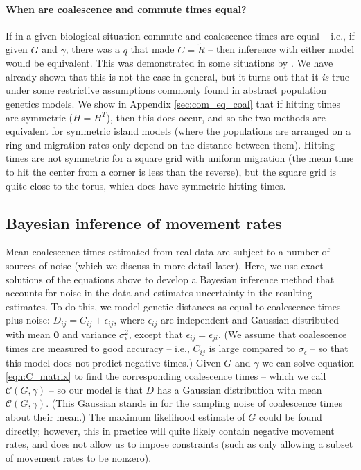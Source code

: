 \documentclass{article}
\newcommand{\comdist}{\widetilde{R}}
\begin{document}
\paragraph{When are coalescence and commute times equal?}
If in a given biological situation commute and coalescence times are equal --
i.e., if given $G$ and $\gamma$, there was a $q$ that made $C = \comdist$ --
then inference with either model would be equivalent.
This was demonstrated in some situations by \citet{mcrae2006isolation}.
We have already shown that this is not the case in general,
but it turns out that it \emph{is} true
under some restrictive assumptions commonly found in abstract population genetics models. 
We show in Appendix \ref{sec:com_eq_coal} that
if hitting times are symmetric ($H = H^T$),
then this does occur,
and so the two methods are equivalent for symmetric island models
(where the populations are arranged on a ring 
and migration rates only depend on the distance between them).
Hitting times are not symmetric for a square grid with uniform migration
(the mean time to hit the center from a corner is less than the reverse),
but the square grid is quite close to the torus, which does have symmetric hitting times.


\subsection*{Bayesian inference of movement rates}

Mean coalescence times estimated from real data are subject to a number of sources of noise
(which we discuss in more detail later).
Here, we use
exact solutions of the equations above
to develop a Bayesian inference method that accounts for noise in the data
and estimates uncertainty in the resulting estimates.
To do this, we model genetic distances as equal to coalescence times plus noise:
$D_{ij} = C_{ij} + \epsilon_{ij}$,
where $\epsilon_{ij}$ are independent and Gaussian distributed
with mean $\mathbf{0}$ and variance $\sigma_\epsilon^2$,
except that $\epsilon_{ij} = \epsilon_{ji}$.
(We assume that coalescence times are measured to good accuracy 
-- i.e., $C_{ij}$ is large compared to $\sigma_{\epsilon}$ -- 
so that this model does not predict negative times.)
Given $G$ and $\gamma$ we can solve equation \eqref{eqn:C_matrix} 
to find the corresponding coalescence times
-- which we call $\mathcal{C}(G, \gamma)$ --
so our model is that $D$ has a Gaussian distribution 
with mean $\mathcal{C}(G, \gamma)$.
(This Gaussian stands in for the sampling noise of coalescence times about their mean.) 
The maximum likelihood estimate of $G$ could be found directly;
however, this in practice will quite likely contain negative movement rates,
and does not allow us to impose constraints
(such as only allowing a subset of movement rates to be nonzero).
\end{document}
